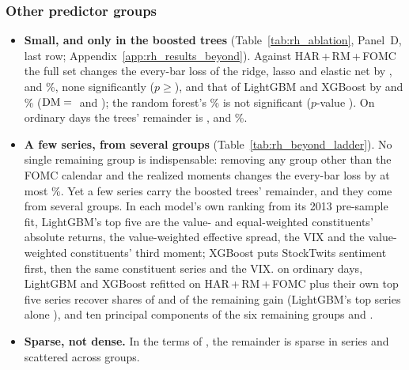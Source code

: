 \subsubsection{Other predictor groups}
\label{sec:rh_fi_rest}
\label{sec:rh_results_beyond}
\begin{itemize}
\item \textbf{Small, and only in the boosted trees} (Table~\ref{tab:rh_ablation}, Panel~D, last row;
  Appendix~\ref{app:rh_results_beyond}). Against HAR\,+\,RM\,+\,FOMC the full set changes the every-bar loss of the
  ridge, lasso and elastic net by \rhabRidgeFullVsAddRmFomcAllPct, \rhabLassoFullVsAddRmFomcAllPct{} and
  \rhabEnetFullVsAddRmFomcAllPct\%, none significantly ($p \geq{}$\rhabLinFullVsAddRmFomcAllPMin), and that of
  LightGBM and XGBoost by \rhabLgbmFullVsAddRmFomcAllPct{} and \rhabXgbFullVsAddRmFomcAllPct\%
  ($\mathrm{DM}={}$\rhabLgbmFullVsAddRmFomcAllDm{} and \rhabXgbFullVsAddRmFomcAllDm); the random forest's
  \rhabRfFullVsAddRmFomcAllPct\% is not significant ($p$-value \rhabRfFullVsAddRmFomcAllP). On ordinary days the trees'
  remainder is \rhabLgbmFullVsAddRmFomcOrdPct, \rhabXgbFullVsAddRmFomcOrdPct{} and \rhabRfFullVsAddRmFomcOrdPct\%.
\item \textbf{A few series, from several groups} (Table~\ref{tab:rh_beyond_ladder}). No single remaining group is
  indispensable: removing any group other than the FOMC calendar and the realized moments changes the every-bar loss
  by at most \rhabLoOtherAllMaxAbs\%. Yet a few series carry the boosted trees' remainder, and they come from several
  groups. In each model's own ranking from its 2013 pre-sample fit, LightGBM's top five are the value- and
  equal-weighted constituents' absolute returns, the value-weighted effective spread, the VIX and the value-weighted
  constituents' third moment; XGBoost puts StockTwits sentiment first, then the same constituent series and the VIX.
  on ordinary days, LightGBM and XGBoost refitted on HAR\,+\,RM\,+\,FOMC plus their own top five series recover
  shares of \rhbyLLgbmKFiveOrdR{} and \rhbyLXgbKFiveOrdR{} of the remaining gain (LightGBM's top series alone
  \rhbyLLgbmKOneOrdR), and ten principal components of the six remaining groups \rhbyFLgbmPcaTenOrdR{} and
  \rhbyFXgbPcaTenOrdR.
\item \textbf{Sparse, not dense.} In the terms of \citet{GiannoneLenzaPrimiceri2021}, the remainder is sparse in
  series and scattered across groups.
\end{itemize}

